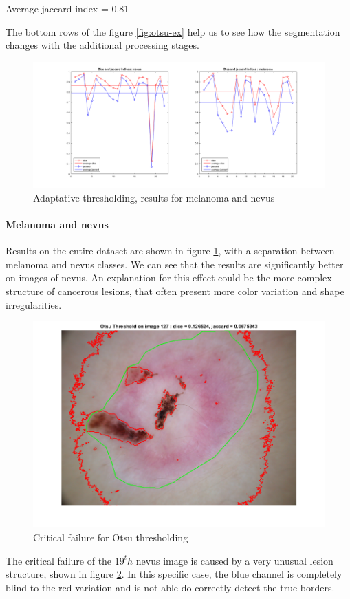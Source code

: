 \documentclass[a4paper,10pt]{article}
\begin{document}
Average jaccard index = 0.81

The bottom rows of the figure \ref{fig:otsu-ex} help us to see how the segmentation changes with the additional processing stages. 

\begin{figure}[h]
	\centering
	\includegraphics[width=0.9\linewidth]{../results/otsu/melaVSnev}
	\caption{Adaptative thresholding, results for melanoma and nevus}
	\label{fig:otsu-melaVSnev}
\end{figure}

\paragraph{Melanoma and nevus} 
Results on the entire dataset are shown in figure \ref{fig:otsu-melaVSnev}, with a separation between melanoma and nevus classes. We can see that the results are significantly better on images of nevus. An explanation for this effect could be the more complex structure of cancerous lesions, that often present more color variation and shape irregularities. 
\begin{figure}[h]
	\centering
	\includegraphics[width=0.40\linewidth]{../results/otsu/otsu-127}
	\caption{Critical failure for Otsu thresholding}
	\label{fig:otsu-127}
\end{figure}

The critical failure of the $19^th$ nevus image is caused by a very unusual lesion structure, shown in figure \ref{fig:otsu-127}. In this specific case, the blue channel is completely blind to the red variation and is not able do correctly detect the true borders.
\end{document}
